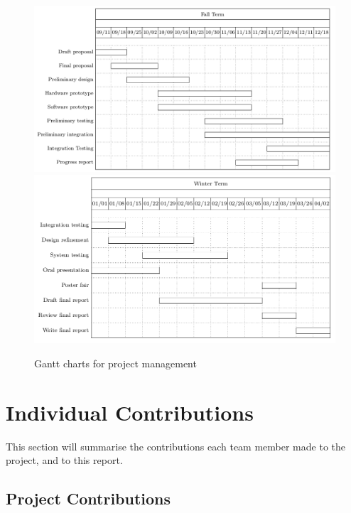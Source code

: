 \documentclass[12pt]{report}
\let\Oldsection\section
\renewcommand{\section}{\FloatBarrier\Oldsection}
\let\Oldsubsection\subsection
\renewcommand{\subsection}{\FloatBarrier\Oldsubsection}
\begin{document}
\begin{figure}
    \includegraphics[width=\textwidth]{Diagrams/gantt_fall}
    \includegraphics[width=\textwidth]{Diagrams/gantt_winter}
    \caption{Gantt charts for project management}
    \label{fig:gantt-charts}
\end{figure}


\section{Individual Contributions} \label{individual-contributions}

This section will summarise the contributions each team member made to the project, and to this report.


\subsection{Project Contributions} \label{project-contributions}
\end{document}
